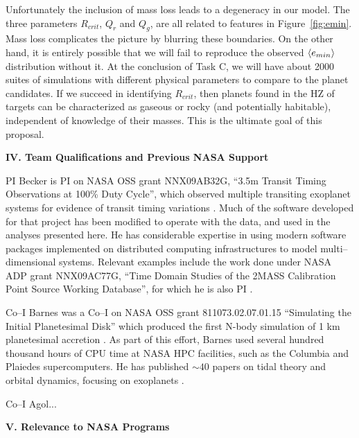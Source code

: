 Unfortunately the inclusion of mass loss leads to a degeneracy in our
model.  The three parameters $R_{crit}$, $Q_r$ and $Q_g$, are all
related to features in Figure~\ref{fig:emin}.  Mass loss complicates
the picture by blurring these boundaries.  On the other hand, it is
entirely possible that we will fail to reproduce the observed
$\left< e_{min} \right>$ distribution without it.  At the conclusion of Task C,
we will have about 2000 suites of simulations with different physical
parameters to compare to the
\kepler planet candidates.  If we succeed in identifying $R_{crit}$,
then planets found in the HZ of \kepler targets can be characterized
as gaseous or rocky (and potentially habitable), independent of
knowledge of their masses.  This is the ultimate goal of this
proposal.

\bigskip
\centerline{\bf IV. Team Qualifications and Previous NASA Support}
\smallskip

PI Becker is PI on NASA OSS grant NNX09AB32G, ``3.5m Transit Timing
Observations at 100\% Duty Cycle'', which observed multiple transiting
exoplanet systems for evidence of transit timing variations
\citep{2011ApJ...731..123K, 2013ApJ...764....8K, 2013ApJ...764L..17B,
  2013arXiv1304.5713K}.  Much of the software developed for that
project has been modified to operate with the \kepler data, and used in
the analyses presented here.  He has considerable expertise in using
modern software packages implemented on distributed computing
infrastructures to model multi--dimensional systems.  Relevant
examples include the work done under NASA ADP grant NNX09AC77G, ``Time
Domain Studies of the 2MASS Calibration Point Source Working
Database'', for which he is also PI
\citep{2012ApJ...748...58D,2013ApJ...764...62D}.

Co--I Barnes was a Co--I on NASA OSS grant 811073.02.07.01.15
``Simulating the Initial Planetesimal Disk'' which produced the first
N-body simulation of 1 km planetesimal accretion
\citep{Barnes09_1km}. As part of this effort, Barnes used several hundred thousand hours of CPU time at NASA HPC facilities, such as the Columbia and Plaiedes supercomputers. He has published $\sim 40$ papers on tidal theory and orbital dynamics, focusing on exoplanets
\citep[e.g.][]{BarnesQuinn01,BarnesRaymond04,BarnesGreenberg06a,Barnes11,Barnes13}. 

Co--I Agol...

\bigskip
\centerline{\bf V. Relevance to NASA Programs}
\smallskip

